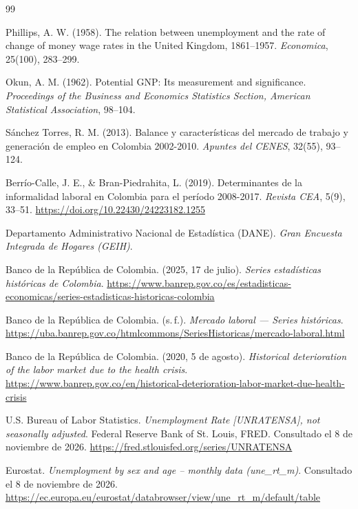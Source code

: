 \documentclass[11pt]{article}
\begin{document}
\begin{thebibliography}{99}

 Phillips, A. W. (1958). The relation between unemployment and the rate of change of money wage rates in the United Kingdom, 1861--1957. \textit{Economica}, 25(100), 283--299.

 Okun, A. M. (1962). Potential GNP: Its measurement and significance. \textit{Proceedings of the Business and Economics Statistics Section, American Statistical Association}, 98--104.

 Sánchez Torres, R. M. (2013). Balance y características del mercado de trabajo y generación de empleo en Colombia 2002-2010. \textit{Apuntes del CENES}, 32(55), 93--124.

 Berrío-Calle, J. E., \& Bran-Piedrahita, L. (2019). Determinantes de la informalidad laboral en Colombia para el período 2008-2017. \textit{Revista CEA}, 5(9), 33--51. \url{https://doi.org/10.22430/24223182.1255}

 Departamento Administrativo Nacional de Estadística (DANE). \textit{Gran Encuesta Integrada de Hogares (GEIH)}.

 Banco de la República de Colombia. (2025, 17 de julio). \textit{Series estadísticas históricas de Colombia}. \url{https://www.banrep.gov.co/es/estadisticas-economicas/series-estadisticas-historicas-colombia}

 Banco de la República de Colombia. (s.\,f.). \textit{Mercado laboral --- Series históricas}. \url{https://uba.banrep.gov.co/htmlcommons/SeriesHistoricas/mercado-laboral.html}

 Banco de la República de Colombia. (2020, 5 de agosto). \textit{Historical deterioration of the labor market due to the health crisis}. \url{https://www.banrep.gov.co/en/historical-deterioration-labor-market-due-health-crisis}

 U.S. Bureau of Labor Statistics. \textit{Unemployment Rate [UNRATENSA], not seasonally adjusted}. Federal Reserve Bank of St. Louis, FRED. Consultado el 8 de noviembre de 2026. \url{https://fred.stlouisfed.org/series/UNRATENSA}

 Eurostat. \textit{Unemployment by sex and age -- monthly data (une\_rt\_m)}. Consultado el 8 de noviembre de 2026. \url{https://ec.europa.eu/eurostat/databrowser/view/une_rt_m/default/table}


\end{thebibliography}
\end{document}
